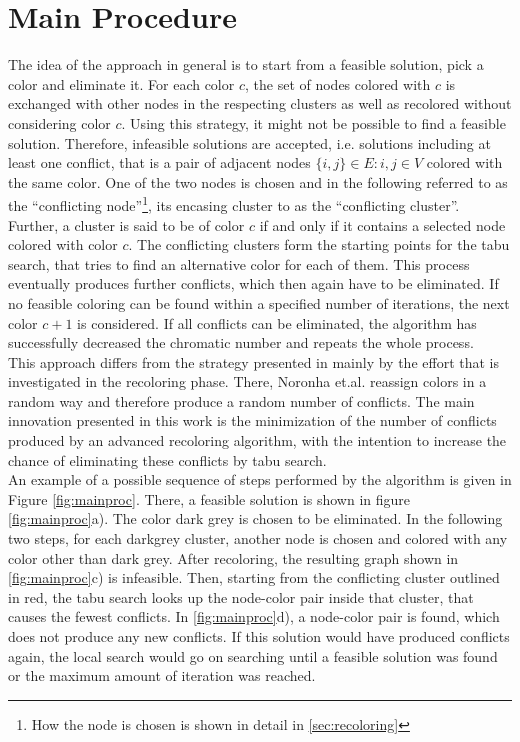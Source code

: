 \section{Main Procedure}
\label{sec:mainalg}
The idea of the approach in general is to start from a feasible solution, pick a color and eliminate it. For each color $c$, the set of nodes colored with $c$ is exchanged with other nodes in the respecting clusters as well as recolored without considering color $c$. Using this strategy, it might not be possible to find a feasible solution. Therefore, infeasible solutions are accepted, i.e. solutions including at least one conflict, that is a pair of adjacent nodes $\{i,j\}\in E : i,j \in V$ colored with the same color. One of the two nodes is chosen and in the following referred to as the ``conflicting node''\footnote{How the node is chosen is shown in detail in \ref{sec:recoloring}}, its encasing cluster to as the ``conflicting cluster''. Further, a cluster is said to be of color $c$ if and only if it contains a selected node colored with color $c$. The conflicting clusters form the starting points for the tabu search, that tries to find an alternative color for each of them. This process eventually produces further conflicts, which then again have to be eliminated. If no feasible coloring can be found within a specified number of iterations, the next color $c+1$ is considered. If all conflicts can be eliminated, the algorithm has successfully decreased the chromatic number and repeats the whole process.\\
This approach differs from the strategy presented in \cite{noronha-06} mainly by the effort that is investigated in the recoloring phase. There, Noronha et.al. reassign colors in a random way and therefore produce a random number of conflicts. The main innovation presented in this work is the minimization of the number of conflicts produced by an advanced recoloring algorithm, with the intention to increase the chance of eliminating these conflicts by tabu search.\\
An example of a possible sequence of steps performed by the algorithm is given in Figure \ref{fig:mainproc}. There, a feasible solution is shown in figure \ref{fig:mainproc}a). The color dark grey is chosen to be eliminated. In the following two steps, for each darkgrey cluster, another node is chosen and colored with any color other than dark grey. After recoloring, the resulting graph shown in \ref{fig:mainproc}c) is infeasible. Then, starting from the conflicting cluster outlined in red, the tabu search looks up the node-color pair inside that cluster, that causes the fewest conflicts. In \ref{fig:mainproc}d), a node-color pair is found, which does not produce any new conflicts. If this solution would have produced conflicts again, the local search would go on searching until a feasible solution was found or the maximum amount of iteration was reached.
